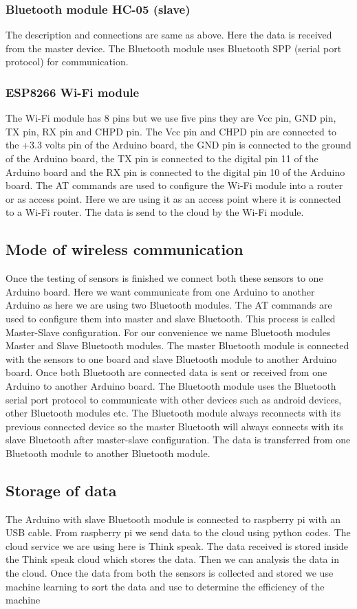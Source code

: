 \subsubsection{Bluetooth module HC-05 (slave)}
The description and connections are same as above. Here the data is received from the master device. The Bluetooth module uses Bluetooth SPP (serial port protocol) for communication.
\subsubsection{ESP8266 Wi-Fi module}
The Wi-Fi module has 8 pins but we use five pins they are Vcc pin, GND pin, TX pin, RX pin and CHPD pin. The Vcc pin and CHPD pin are connected to the +3.3 volts pin of the Arduino board, the GND pin is connected to the ground of the Arduino board, the TX pin is connected to the digital pin 11 of the Arduino board and the RX pin is connected to the digital pin 10 of the Arduino board. The AT commands are used to configure the Wi-Fi module into a router or as access point. Here we are using it as an access point where it is connected to a Wi-Fi router. The data is send to the cloud by the Wi-Fi module.

\subsection{Mode of wireless communication}
Once the testing of sensors is finished we connect both these sensors to one Arduino board. Here we want communicate from one Arduino to another Arduino as here we are using two Bluetooth modules. The AT commands are used to configure them into master and slave Bluetooth. This process is called Master-Slave configuration. For our convenience we name Bluetooth modules Master and Slave Bluetooth modules. The master Bluetooth module is connected with the sensors to one board and slave Bluetooth module to another Arduino board. Once both Bluetooth are connected data is sent or received from one Arduino to another Arduino board.
The Bluetooth module uses the Bluetooth serial port protocol to communicate with other devices such as android devices, other Bluetooth modules etc. The Bluetooth module always reconnects with its previous connected device so the master Bluetooth will always connects with its slave Bluetooth after master-slave configuration. The data is transferred from one Bluetooth module to another Bluetooth module.
\subsection{Storage of data }
The Arduino with slave Bluetooth module is connected to raspberry pi with an USB cable. From raspberry pi we send data to the cloud using python codes. The cloud service we are using here is Think speak. The data received is stored inside the Think speak cloud which stores the data. Then we can analysis the data in the cloud. Once the data from both the sensors is collected and stored we use machine learning to sort the data and use to determine the efficiency of the machine
